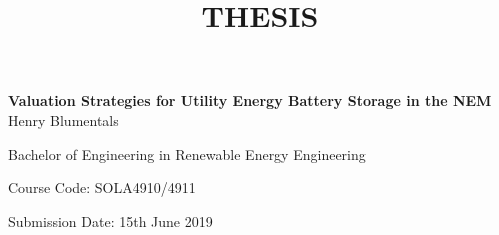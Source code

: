 \documentclass[11pt,fleqn]{book} %
\begin{document}
\title{THESIS}


\begingroup
\thispagestyle{empty}
\centering
\vspace*{2.5cm}
\par\normalfont\fontsize{28}{28}\sffamily\selectfont
\textbf{ Valuation Strategies for Utility Energy Battery Storage in the NEM }\\
\vspace*{0.5cm}
{\Large Henry Blumentals }\par 
{\Large Bachelor of Engineering in Renewable Energy Engineering}\par 
{\Large Course Code: SOLA4910/4911}\par
{\Large Submission Date: 15th June 2019}\par
\vspace*{0.5cm}
\endgroup
\newpage 
\end{document}
